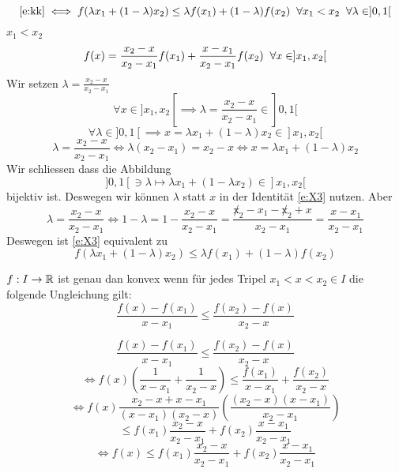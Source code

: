 \begin{Lem}
  \[\eqref{e:kk}\iff f(\lambda x_1+(1-\lambda)x_2)\leq\lambda f(x_1)+(1-\lambda)f(x_2)\hspace{2mm}\forall x_1 < x_2\hspace{2mm}\forall \lambda\in ]0,1[\]
\end{Lem}
\begin{Bew}
  $x_1<x_2$
\begin{equation}\label{e:X3}
f(x)=\frac{x_2-x}{x_2-x_1}f(x_1)+\frac{x-x_1}{x_2-x_1}f(x_2)\hspace{2mm}
\forall x\in ]x_1,x_2[
\end{equation}
Wir setzen $\lambda = \frac{x_2-x}{x_2-x_1}$
  \[\forall x\in ]x_1,x_2[\implies \lambda=\frac{x_2-x}{x_2-x_1}\in ]0,1[\]
  \[\forall \lambda\in ]0,1[\implies x=\lambda x_1+(1-\lambda)x_2\in ]x_1,x_2[\]
  \[\lambda=\frac{x_2-x}{x_2-x_1}\iff \lambda(x_2-x_1)=x_2-x\iff x=\lambda x_1+(1-\lambda)x_2\]
Wir schliessen dass die Abbildung
  \[ ]0,1[\ni\lambda\mapsto \lambda x_1+(1-\lambda x_2)\in  ]x_1,x_2[\]
bijektiv ist. Deswegen wir k\"onnen $\lambda$ statt $x$ in der Identit\"at \eqref{e:X3}
nutzen.
Aber 
\[\lambda=\frac{x_2-x}{x_2-x_1}\iff 1-\lambda=1-\frac{x_2-x}{x_2-x_1}
=\frac{\not x_2-x_1-\not x_2+x}{x_2-x_1}=\frac{x-x_1}{x_2-x_1}\]
Deswegen ist \eqref{e:X3} equivalent zu
  \[f(\lambda x_1+(1-\lambda)x_2)\leq \lambda f(x_1)+(1-\lambda)f(x_2)\]
\end{Bew}
\begin{Lem}
  $f:I\to \mathbb{R}$ ist genau dan konvex wenn für jedes Tripel $x_1<x<x_2\in I$ die folgende Ungleichung gilt:
  \[\frac{f(x)-f(x_1)}{x-x_1}\leq \frac{f(x_2)-f(x)}{x_2-x}\]
\end{Lem}
\begin{Bew}
  \[\frac{f(x)-f(x_1)}{x-x_1}\leq \frac{f(x_2)-f(x)}{x_2-x}\]
  \[\iff f(x)\left( \frac{1}{x-x_1}+\frac{1}{x_2-x} \right)\leq \frac{f(x_1)}{x-x_1}+\frac{f(x_2)}{x_2-x}\]
  \[\iff f(x)\frac{x_2-x+x-x_1}{(x-x_1)(x_2-x)}\left( \frac{(x_2-x)(x-x_1)}{x_2-x_1} \right)\]
  \[ \leq f(x_1)\frac{x_2-x}{x_2-x_1}+f(x_2)\frac{x-x_1}{x_2-x_1}\]
  \[\iff f(x)\leq f(x_1)\frac{x_2-x}{x_2-x_1}+f(x_2)\frac{x-x_1}{x_2-x_1}\]
\end{Bew}
